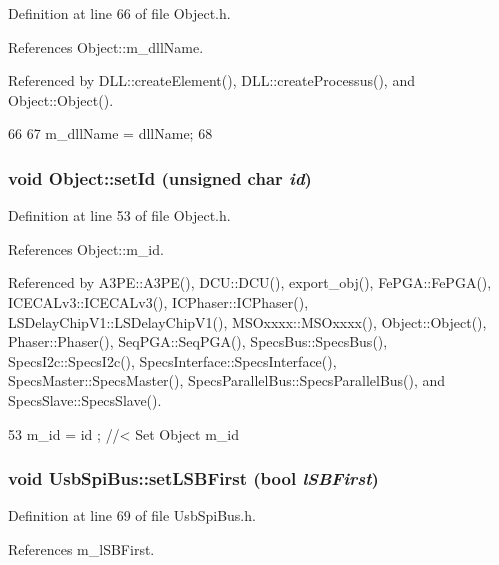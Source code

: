 Definition at line 66 of file Object.h.

References Object::m\_\-dllName.

Referenced by DLL::createElement(), DLL::createProcessus(), and Object::Object().


\begin{DoxyCode}
66                                       {
67     m_dllName = dllName;
68   }
\end{DoxyCode}
\hypertarget{classObject_a398fe08cba594a0ce6891d59fe4f159f}{
\subsubsection[{setId}]{\setlength{\rightskip}{0pt plus 5cm}void Object::setId (unsigned char {\em id})}}
\label{classObject_a398fe08cba594a0ce6891d59fe4f159f}


Definition at line 53 of file Object.h.

References Object::m\_\-id.

Referenced by A3PE::A3PE(), DCU::DCU(), export\_\-obj(), FePGA::FePGA(), ICECALv3::ICECALv3(), ICPhaser::ICPhaser(), LSDelayChipV1::LSDelayChipV1(), MSOxxxx::MSOxxxx(), Object::Object(), Phaser::Phaser(), SeqPGA::SeqPGA(), SpecsBus::SpecsBus(), SpecsI2c::SpecsI2c(), SpecsInterface::SpecsInterface(), SpecsMaster::SpecsMaster(), SpecsParallelBus::SpecsParallelBus(), and SpecsSlave::SpecsSlave().


\begin{DoxyCode}
53 { m_id    = id    ; } //< Set Object m_id
\end{DoxyCode}
\hypertarget{classUsbSpiBus_ab601d59e0b5110c2275c1cc298664e27}{
\subsubsection[{setLSBFirst}]{\setlength{\rightskip}{0pt plus 5cm}void UsbSpiBus::setLSBFirst (bool {\em lSBFirst})}}
\label{classUsbSpiBus_ab601d59e0b5110c2275c1cc298664e27}


Definition at line 69 of file UsbSpiBus.h.

References m\_\-lSBFirst.

